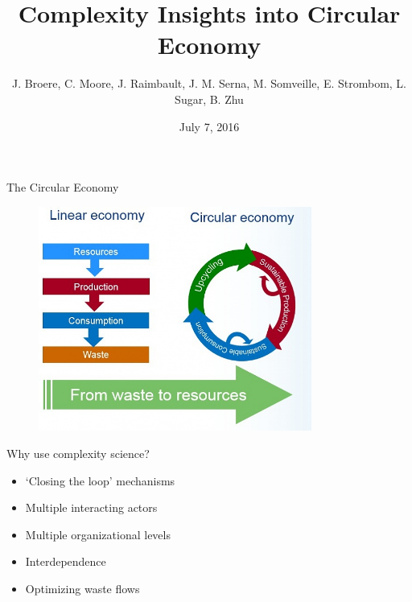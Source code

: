 \documentclass{beamer}
\title[Circular Economy]{Complexity Insights into Circular Economy}
\author{J. Broere, C. Moore, J. Raimbault, J. M. Serna, M. Somveille, E. Strombom, L. Sugar, B. Zhu}
\date{July 7, 2016}
\begin{document}
\begin{frame}
  \titlepage
\end{frame}




\begin{frame}{The Circular Economy}

\begin{figure}
\includegraphics[width=0.8\textwidth]{CE.jpg}

\end{figure}

\end{frame}



\begin{frame}{Why use complexity science?}

\begin{itemize}
\item `Closing the loop' mechanisms
\item Multiple interacting actors 
\item Multiple organizational levels
\item Interdependence
\item Optimizing waste flows
\end{itemize}



\end{frame}
\end{document}
